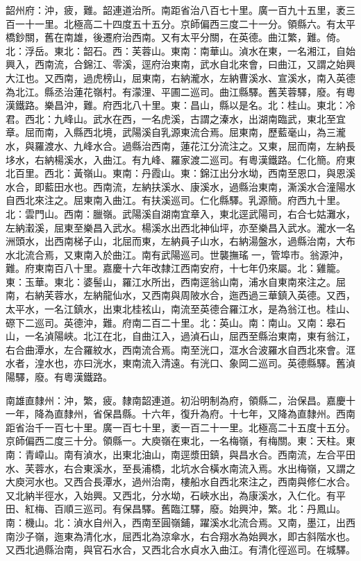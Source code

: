 \begin{pinyinscope}
韶州府：沖，疲，難。韶連道治所。南距省治八百七十里。廣一百九十五里，袤三百一十一里。北極高二十四度五十五分。京師偏西三度二十一分。領縣六。有太平橋鈔關，舊在南雄，後遷府治西南。又有太平分關，在英德。曲江繁，難。倚。北：浮岳。東北：韶石。西：芙蓉山。東南：南華山。湞水在東，一名湘江，自始興入，西南流，合錦江、零溪，逕府治東南，武水自北來會，曰曲江，又謂之始興大江也。又西南，過虎榜山，屈東南，右納瀧水，左納曹溪水、宣溪水，南入英德為北江。縣丞治蓮花嶺村。有濛浬、平圃二巡司。曲江縣驛。舊芙蓉驛，廢。有粵漢鐵路。樂昌沖，難。府西北八十里。東：昌山，縣以是名。北：桂山。東北：冷君。西北：九峰山。武水在西，一名虎溪，古謂之溱水，出湖南臨武，東北至宜章。屈而南，入縣西北境，武陽溪自乳源東流合焉。屈東南，歷藍毫山，為三瀧水，與羅渡水、九峰水合。過縣治西南，蓮花江分流注之。又東，屈而南，左納長垑水，右納楊溪水，入曲江。有九峰、羅家渡二巡司。有粵漢鐵路。仁化簡。府東北百里。西北：黃嶺山。東南：丹霞山。東：錦江出分水坳，西南至恩口，與恩溪水合，即藍田水也。西南流，左納扶溪水、康溪水，過縣治東南，澌溪水合潼陽水自西北來注之。屈東南入曲江。有扶溪巡司。仁化縣驛。乳源簡。府西九十里。北：雲門山。西南：臘嶺。武陽溪自湖南宜章入，東北逕武陽司，右合七姑灘水，左納瀔溪，屈東至樂昌入武水。楊溪水出西北神仙坪，亦至樂昌入武水。瀧水一名洲頭水，出西南梯子山，北屈而東，左納員子山水，右納湯盤水，過縣治南，大布水北流合焉，又東南入於曲江。南有武陽巡司。世襲撫瑤一，管埠巿。翁源沖，難。府東南百八十里。嘉慶十六年改隸江西南安府，十七年仍來屬。北：雞籠。東：玉華。東北：婆髻山，羅江水所出，西南逕翁山南，浦水自東南來注之。屈南，右納芙蓉水，左納龍仙水，又西南與周陂水合，迤西過三華鎮入英德。又西，太平水，一名江鎮水，出東北桂袨山，南流至英德合羅江水，是為翁江也。桂山、磜下二巡司。英德沖，難。府南二百二十里。北：英山。南：南山。又南：皋石山，一名湞陽峽。北江在北，自曲江入，過湞石山，屈西至縣治東南，東有翁江，右合曲潭水，左合羅紋水，西南流合焉。南至洸口，洭水合波羅水自西北來會。洭水者，湟水也，亦曰洸水，東南流入清遠。有洸口、象岡二巡司。英德縣驛。舊湞陽驛，廢。有粵漢鐵路。

南雄直隸州：沖，繁，疲。隸南韶連道。初沿明制為府，領縣二，治保昌。嘉慶十一年，降為直隸州，省保昌縣。十六年，復升為府。十七年，又降為直隸州。西南距省治千一百七十里。廣一百七十里，袤一百二十一里。北極高二十五度十五分。京師偏西二度三十分。領縣一。大庾嶺在東北，一名梅嶺，有梅關。東：天柱。東南：青嶂山。南有湞水，出東北油山，南逕漿田鎮，與昌水合。西南流，左合平田水、芙蓉水，右合東溪水，至長浦橋，北坑水合橫水南流入焉。水出梅嶺，又謂之大庾河水也。又西合長潭水，過州治南，樓船水自西北來注之，西南與修仁水合。又北納半徑水，入始興。又西北，分水坳，石峽水出，為康溪水，入仁化。有平田、紅梅、百順三巡司。有保昌驛。舊臨江驛，廢。始興沖，繁。北：丹鳳山。南：機山。北：湞水自州入，西南至圓嶺鋪，躍溪水北流合焉。又南，墨江，出西南沙子嶺，迤東為清化水，屈西北為涼傘水，右合翔水為始興水，即古斜階水也。又西北過縣治南，與官石水合，又西北合水貞水入曲江。有清化徑巡司。在城驛。


\end{pinyinscope}
